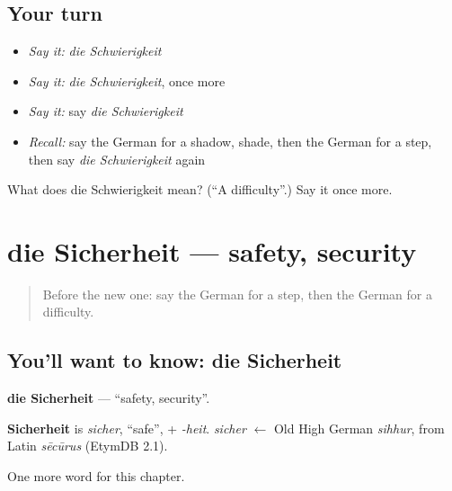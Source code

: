 \subsection*{Your turn}
\begin{itemize}
\raggedright
  \item \emph{Say it:} \emph{die Schwierigkeit}
  \item \emph{Say it:} \emph{die Schwierigkeit}, once more
  \item \emph{Say it:} say \emph{die Schwierigkeit}
  \item \emph{Recall:} say the German for a shadow, shade, then the German for a step, then say \emph{die Schwierigkeit} again
\end{itemize}

\begin{tcolorbox}[breakable,colback=teal!4,colframe=teal!35!black,title={Before you move on}]
What does die Schwierigkeit mean? (\textquotedblleft{}A difficulty\textquotedblright{}.) Say it once more.
\end{tcolorbox}
\section[die Sicherheit]{die Sicherheit — safety, security}

\label{lesson:GE-C238-sicherheit}



\begin{quote}
Before the new one: say the German for a step, then the German for a difficulty.
\end{quote}

\subsection*{You'll want to know: die Sicherheit}
\textbf{die Sicherheit} — \textquotedblleft{}safety, security\textquotedblright{}.

\begin{cousinweb}
\textbf{Sicherheit} is \emph{sicher}, \textquotedblleft{}safe\textquotedblright{}, + \emph{-heit}. \emph{sicher} $\leftarrow$ Old High German \emph{sihhur}, from Latin \emph{sēcūrus} (EtymDB 2.1).
\end{cousinweb}

\begin{grammarlens}[title={What you've built}]
One more word for this chapter.
\end{grammarlens}


